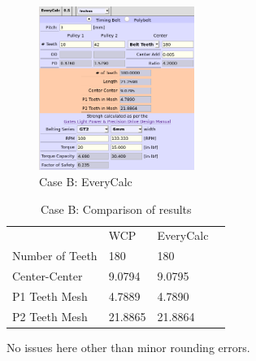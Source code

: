 \documentclass[10pt,letterpaper]{article}
\begin{document}
	\begin{figure}[H]
		\includegraphics[width=0.45\textwidth]{validation/belts_EC_B.png}
		\caption{Case B: EveryCalc}
	\end{figure}

	\begin{table}[H]
	\begin{tabular}{llll}
	                 & WCP     & EveryCalc \\ \cline{1-3} 
	 Number of Teeth & 180     & 180      \\
	 Center-Center   & 9.0794  & 9.0795  \\
	 P1 Teeth Mesh   & 4.7889  & 4.7890 \\
	 P2 Teeth Mesh   & 21.8865 & 21.8864 
	\end{tabular}
	\caption{Case B: Comparison of results}
	\end{table}

	No issues here other than minor rounding errors.
	
\end{document}
